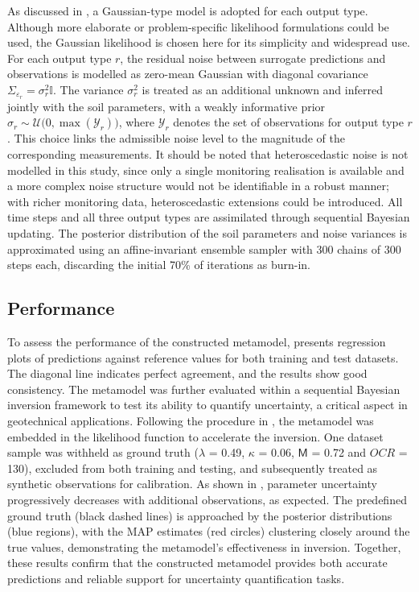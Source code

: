 As discussed in , a Gaussian-type model is adopted for each output type. Although more elaborate or problem-specific likelihood formulations could be used, the Gaussian likelihood is chosen here for its simplicity and widespread use. For each output type $r$, the residual noise between surrogate predictions and observations is modelled as zero-mean Gaussian with diagonal covariance $\Sigma_{\varepsilon_r} = \sigma_r^{2}\mathbb{I}$. The variance $\sigma_r^{2}$ is treated as an additional unknown and inferred jointly with the soil parameters, with a weakly informative prior $\sigma_r \sim \mathcal{U}\bigl(0,\max(\mathcal{Y}_r)\bigr)$, where $\mathcal{Y}_r$ denotes the set of observations for output type $r$. This choice links the admissible noise level to the magnitude of the corresponding measurements. It should be noted that heteroscedastic noise is not modelled in this study, since only a single monitoring realisation is available and a more complex noise structure would not be identifiable in a robust manner; with richer monitoring data, heteroscedastic extensions could be introduced. All time steps and all three output types are assimilated through sequential Bayesian updating. The posterior distribution of the soil parameters and noise variances is approximated using an affine-invariant ensemble sampler with 300 chains of 300 steps each, discarding the initial 70\% of iterations as burn-in.


\subsection{Performance}\noindent
To assess the performance of the constructed metamodel,  presents regression plots of predictions against reference values for both training and test datasets. The diagonal line indicates perfect agreement, and the results show good consistency. The metamodel was further evaluated within a sequential Bayesian inversion framework to test its ability to quantify uncertainty, a critical aspect in geotechnical applications. Following the procedure in , the metamodel was embedded in the likelihood function to accelerate the inversion. One dataset sample was withheld as ground truth ($\lambda$ = 0.49, $\kappa$ = 0.06, $\mathsf{M}$ = 0.72 and $OCR$ = 130), excluded from both training and testing, and subsequently treated as synthetic observations for calibration. As shown in , parameter uncertainty progressively decreases with additional observations, as expected. The predefined ground truth (black dashed lines) is approached by the posterior distributions (blue regions), with the MAP estimates (red circles) clustering closely around the true values, demonstrating the metamodel’s effectiveness in inversion. Together, these results confirm that the constructed metamodel provides both accurate predictions and reliable support for uncertainty quantification tasks.






